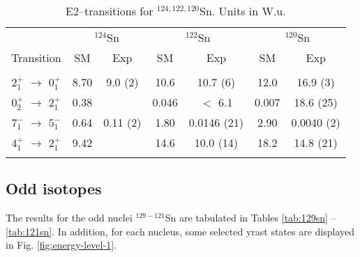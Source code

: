 \begin{table}[htbp]
\begin{center}
\begin{tabular}{ccccccc}
\hline
 & \multicolumn{2}{c}{ $^{124}$Sn} &  \multicolumn{2}{c}{ $^{122}$Sn} &
\multicolumn{2}{c}{ $^{120}$Sn} \\
Transition& SM & Exp & SM & Exp & SM & Exp \\ 
\hline \\
$2_{1}^{+}$ $\rightarrow$ $0_{1}^{+}$ & 8.70 & 9.0 (2)  & 10.6 & 
                                          10.7 (6)   & 12.0  & 16.9 (3) \\ 
$0_{2}^{+}$ $\rightarrow$ $2_{1}^{+}$ & 0.38 &          & 0.046 & 
                                            $<$ 6.1  & 0.007 & 18.6 (25) \\ 
$7_{1}^{-}$ $\rightarrow$ $5_{1}^{-}$ & 0.64 & 0.11 (2) & 1.80 & 
                                         0.0146 (21) & 2.90  & 0.0040 (2) \\
$4_{1}^{+}$ $\rightarrow$ $2_{1}^{+}$ & 9.42 &          & 14.6 & 
                                         10.0 (14)   & 18.2  & 14.8 (21) \\
&&&&\\
\hline
\end{tabular}
\caption{E2--transitions for $^{124,122,120}$Sn. Units in W.u.}
\label{tab:rateofe2}
\end{center}
\end{table}


\subsection{Odd isotopes}

The results for the odd nuclei $^{129 - 121}$Sn are tabulated in Tables
\ref{tab:129sn} -- \ref{tab:121sn}. In addition, for each nucleus, some 
selected yrast states are displayed in Fig. \ref{fig:energy-level-1}.


